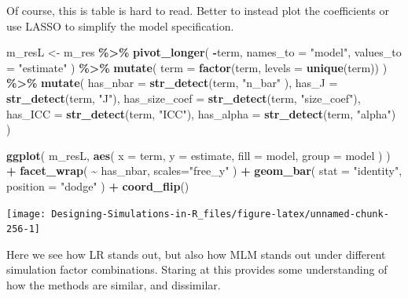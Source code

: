 \documentclass[
]{book}
\newenvironment{Shaded}{\begin{snugshade}}{\end{snugshade}}
\newcommand{\AttributeTok}[1]{\textcolor[rgb]{0.13,0.29,0.53}{#1}}
\newcommand{\FunctionTok}[1]{\textcolor[rgb]{0.13,0.29,0.53}{\textbf{#1}}}
\newcommand{\NormalTok}[1]{#1}
\newcommand{\OtherTok}[1]{\textcolor[rgb]{0.56,0.35,0.01}{#1}}
\newcommand{\SpecialCharTok}[1]{\textcolor[rgb]{0.81,0.36,0.00}{\textbf{#1}}}
\newcommand{\StringTok}[1]{\textcolor[rgb]{0.31,0.60,0.02}{#1}}
\begin{document}
Of course, this is table is hard to read. Better to instead plot the coefficients or use LASSO to simplify the model specification.

\begin{Shaded}
\begin{Highlighting}[]
\NormalTok{m\_resL }\OtherTok{\textless{}{-}}\NormalTok{ m\_res }\SpecialCharTok{\%\textgreater{}\%}
  \FunctionTok{pivot\_longer}\NormalTok{( }\SpecialCharTok{{-}}\NormalTok{term, }
                \AttributeTok{names\_to =} \StringTok{"model"}\NormalTok{, }\AttributeTok{values\_to =} \StringTok{"estimate"}\NormalTok{ ) }\SpecialCharTok{\%\textgreater{}\%}
  \FunctionTok{mutate}\NormalTok{( }\AttributeTok{term =} \FunctionTok{factor}\NormalTok{(term, }\AttributeTok{levels =} \FunctionTok{unique}\NormalTok{(term)) ) }\SpecialCharTok{\%\textgreater{}\%}
  \FunctionTok{mutate}\NormalTok{( }\AttributeTok{has\_nbar =} \FunctionTok{str\_detect}\NormalTok{(term, }\StringTok{"n\_bar"}\NormalTok{ ),}
          \AttributeTok{has\_J =} \FunctionTok{str\_detect}\NormalTok{(term, }\StringTok{"J"}\NormalTok{),}
          \AttributeTok{has\_size\_coef =} \FunctionTok{str\_detect}\NormalTok{(term, }\StringTok{"size\_coef"}\NormalTok{),}
          \AttributeTok{has\_ICC =} \FunctionTok{str\_detect}\NormalTok{(term, }\StringTok{"ICC"}\NormalTok{),}
          \AttributeTok{has\_alpha =} \FunctionTok{str\_detect}\NormalTok{(term, }\StringTok{"alpha"}\NormalTok{) )}

\FunctionTok{ggplot}\NormalTok{( m\_resL,}
        \FunctionTok{aes}\NormalTok{( }\AttributeTok{x =}\NormalTok{ term, }\AttributeTok{y =}\NormalTok{ estimate, }
             \AttributeTok{fill =}\NormalTok{ model, }\AttributeTok{group =}\NormalTok{ model ) ) }\SpecialCharTok{+}
  \FunctionTok{facet\_wrap}\NormalTok{( }\SpecialCharTok{\textasciitilde{}}\NormalTok{ has\_nbar, }\AttributeTok{scales=}\StringTok{"free\_y"}\NormalTok{ ) }\SpecialCharTok{+}
  \FunctionTok{geom\_bar}\NormalTok{( }\AttributeTok{stat =} \StringTok{"identity"}\NormalTok{, }\AttributeTok{position =} \StringTok{"dodge"}\NormalTok{ ) }\SpecialCharTok{+}
  \FunctionTok{coord\_flip}\NormalTok{()}
\end{Highlighting}
\end{Shaded}

\begin{center}\texttt{[image: Designing-Simulations-in-R\_files/figure-latex/unnamed-chunk-256-1]} \end{center}

Here we see how LR stands out, but also how MLM stands out under different simulation factor combinations.
Staring at this provides some understanding of how the methods are similar, and dissimilar.
\end{document}
